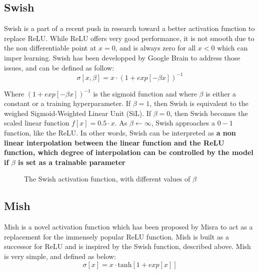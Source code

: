 \subsection{Swish}
Swish\cite{swish} is a part of a recent push in research toward a better activation function to replace ReLU. While ReLU offers very good performance, it is not smooth due to the non differentiable point at $x = 0$, and is always zero for all $x < 0$ which can imper learning. Swish has been developped by Google Brain to address those issues, and can be defined as follow:
\begin{equation}
	\sigma[x, \beta] = x \cdot (1 + exp[-\beta x])^{-1}
\end{equation}

Where $(1 + exp[-\beta x])^{-1}$ is the sigmoid function and where $\beta$ is either a constant or a training \gls{hyperparameter}. If $\beta = 1$, then Swish is equivalent to the weighed Sigmoid-Weighted Linear Unit (SiL). If $\beta = 0$, then Swish becomes the scaled linear function $f[x] = 0.5 \cdot x$. As $\beta \leftarrow \infty$, Swish approaches a $0-1$ function, like the ReLU. In other words, Swish can be interpreted as \textbf{a non linear interpolation between the linear function and the ReLU function, which degree of interpolation can be controlled by the model if $\beta$ is set as a trainable parameter}
	\begin{figure}[H]
		\centering
		
			\caption{The Swish activation function, with different values of $\beta$}
			  \label{fig:swish}
	\end{figure}

\subsection{Mish}
Mish is a novel activation function which has been proposed by Misra\cite{mish} to act as a replacement for the immensely popular ReLU function.  Mish is built as a successor for ReLU and is inspired by the Swish function, described above. Mish is very simple, and defined as below: 
\begin{equation}
	\sigma[x] = x \cdot \text{tanh}[1 + exp[x]]
\end{equation}

